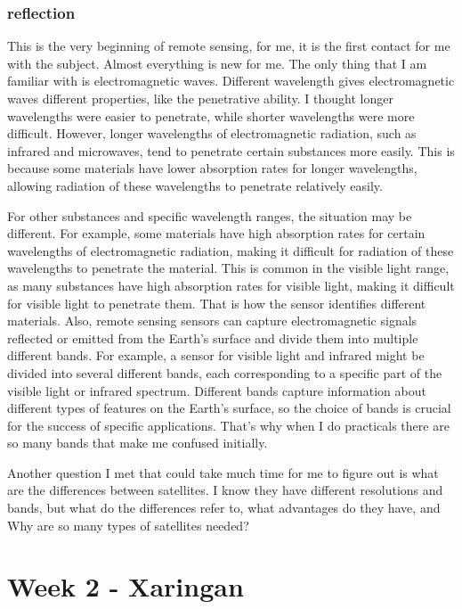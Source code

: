 \documentclass[
  letterpaper,
  DIV=11,
  numbers=noendperiod]{scrreprt}
\begin{document}
\hypertarget{reflection}{%
\subsection{reflection}\label{reflection}}

This is the very beginning of remote sensing, for me, it is the first
contact for me with the subject. Almost everything is new for me. The
only thing that I am familiar with is electromagnetic waves. Different
wavelength gives electromagnetic waves different properties, like the
penetrative ability. I thought longer wavelengths were easier to
penetrate, while shorter wavelengths were more difficult. However,
longer wavelengths of electromagnetic radiation, such as infrared and
microwaves, tend to penetrate certain substances more easily. This is
because some materials have lower absorption rates for longer
wavelengths, allowing radiation of these wavelengths to penetrate
relatively easily.

For other substances and specific wavelength ranges, the situation may
be different. For example, some materials have high absorption rates for
certain wavelengths of electromagnetic radiation, making it difficult
for radiation of these wavelengths to penetrate the material. This is
common in the visible light range, as many substances have high
absorption rates for visible light, making it difficult for visible
light to penetrate them. That is how the sensor identifies different
materials. Also, remote sensing sensors can capture electromagnetic
signals reflected or emitted from the Earth's surface and divide them
into multiple different bands. For example, a sensor for visible light
and infrared might be divided into several different bands, each
corresponding to a specific part of the visible light or infrared
spectrum. Different bands capture information about different types of
features on the Earth's surface, so the choice of bands is crucial for
the success of specific applications. That's why when I do practicals
there are so many bands that make me confused initially.

Another question I met that could take much time for me to figure out is
what are the differences between satellites. I know they have different
resolutions and bands, but what do the differences refer to, what
advantages do they have, and Why are so many types of satellites needed?


\hypertarget{week-2---xaringan}{%
\chapter{Week 2 - Xaringan}\label{week-2---xaringan}}
\end{document}
